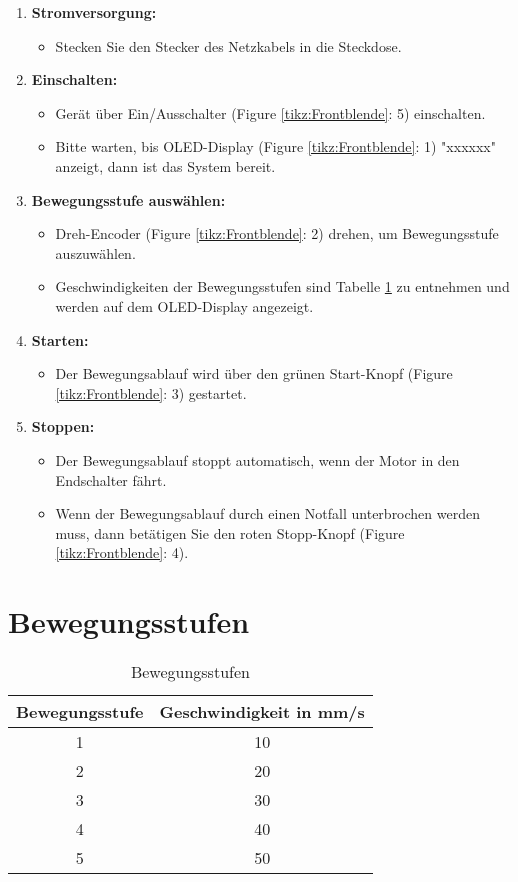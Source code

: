 \documentclass[12pt,a4paper]{scrbook}
\begin{document}
	\begin{enumerate}
		\item \textbf{Stromversorgung:}
		\begin{itemize}
			\item Stecken Sie den Stecker des Netzkabels in die Steckdose.
		\end{itemize}
		\item \textbf{Einschalten:}
		\begin{itemize}
			\item Gerät über Ein/Ausschalter (Figure \ref{tikz:Frontblende}: 5) einschalten.
			\item Bitte warten, bis OLED-Display (Figure \ref{tikz:Frontblende}: 1) "xxxxxx" anzeigt, dann ist das System bereit.
		\end{itemize}
		\item \textbf{Bewegungsstufe auswählen:}
		\begin{itemize}
			\item Dreh-Encoder (Figure \ref{tikz:Frontblende}: 2) drehen, um Bewegungsstufe auszuwählen.
			\item Geschwindigkeiten der Bewegungsstufen sind Tabelle \ref{tab:Bewegungsstufen} zu entnehmen und werden auf dem OLED-Display angezeigt.
		\end{itemize}
		\item \textbf{Starten:}
		\begin{itemize}
			\item Der Bewegungsablauf wird über den grünen Start-Knopf (Figure \ref{tikz:Frontblende}: 3) gestartet.
		\end{itemize}
		\item \textbf{Stoppen:}
		\begin{itemize}
			\item Der Bewegungsablauf stoppt automatisch, wenn der Motor in den Endschalter fährt.
			\item Wenn der Bewegungsablauf durch einen Notfall unterbrochen werden muss, dann betätigen Sie den roten Stopp-Knopf (Figure \ref{tikz:Frontblende}: 4).
		\end{itemize}
	\end{enumerate}
	
		\section{Bewegungsstufen}
		
		\begin{table}[htpb]
			\centering
			\begin{tabular}{|c|c|}
				\hline
				\textbf{Bewegungsstufe} & \textbf{Geschwindigkeit in mm/s} \\
				\hline
				1 & 10 \\
				2 & 20 \\
				3 & 30 \\
				4 & 40 \\
				5 & 50 \\
				\hline
			\end{tabular}
			\caption{Bewegungsstufen}
			\label{tab:Bewegungsstufen}
		\end{table}
	


		
\end{document}
